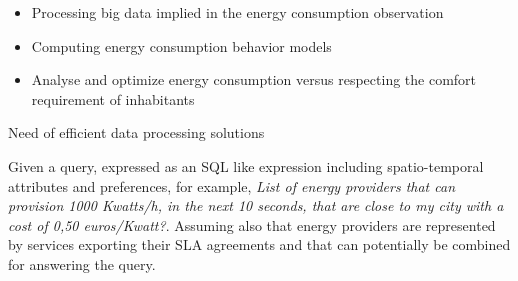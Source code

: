 \begin{itemize}
\item Processing big data implied in the energy consumption observation 
\item Computing energy consumption behavior models
\item Analyse and optimize energy consumption versus respecting the comfort requirement of inhabitants
\end{itemize}

Need of efficient data processing solutions


 Given a query, expressed as an SQL like expression including spatio-temporal attributes and preferences, for example, {\em List of energy providers that can provision 1000 Kwatts/h, in the next 10 seconds, that are close to my city with a cost of 0,50 euros/Kwatt?}. Assuming also that energy providers are represented by services exporting their SLA agreements and that can potentially be combined for answering the query. 